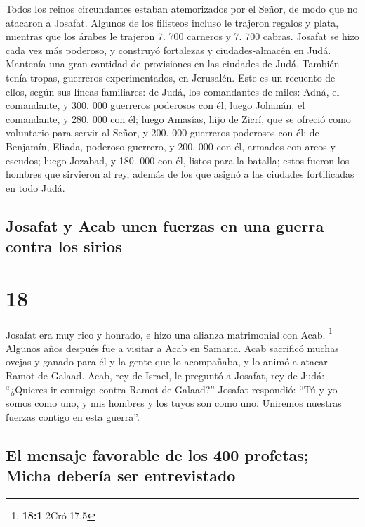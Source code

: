  Todos los reinos circundantes estaban atemorizados por
el Señor, de modo que no atacaron a Josafat.  Algunos de
los filisteos incluso le trajeron regalos y plata, mientras que los
árabes le trajeron 7. 700 carneros y 7. 700 cabras. 
Josafat se hizo cada vez más poderoso, y construyó fortalezas y
ciudades-almacén en Judá.  Mantenía una gran cantidad de
provisiones en las ciudades de Judá. También tenía tropas, guerreros
experimentados, en Jerusalén.  Este es un recuento de
ellos, según sus líneas familiares: de Judá, los comandantes de miles:
Adná, el comandante, y 300. 000 guerreros poderosos con él;
 luego Johanán, el comandante, y 280. 000 con él;
 luego Amasías, hijo de Zicrí, que se ofreció como
voluntario para servir al Señor, y 200. 000 guerreros poderosos con él;
 de Benjamín, Eliada, poderoso guerrero, y 200. 000 con
él, armados con arcos y escudos;  luego Jozabad, y 180.
000 con él, listos para la batalla;  estos fueron los
hombres que sirvieron al rey, además de los que asignó a las ciudades
fortificadas en todo Judá.

\hypertarget{josafat-y-acab-unen-fuerzas-en-una-guerra-contra-los-sirios}{%
\subsection{Josafat y Acab unen fuerzas en una guerra contra los
sirios}\label{josafat-y-acab-unen-fuerzas-en-una-guerra-contra-los-sirios}}

\hypertarget{section-17}{%
\section{18}\label{section-17}}

 Josafat era muy rico y honrado, e hizo una alianza
matrimonial con Acab. \footnote{\textbf{18:1} 2Cró 17,5} 
Algunos años después fue a visitar a Acab en Samaria. Acab sacrificó
muchas ovejas y ganado para él y la gente que lo acompañaba, y lo animó
a atacar Ramot de Galaad.  Acab, rey de Israel, le
preguntó a Josafat, rey de Judá: ``¿Quieres ir conmigo contra Ramot de
Galaad?'' Josafat respondió: ``Tú y yo somos como uno, y mis hombres y
los tuyos son como uno. Uniremos nuestras fuerzas contigo en esta
guerra''.

\hypertarget{el-mensaje-favorable-de-los-400-profetas-micha-deberuxeda-ser-entrevistado}{%
\subsection{El mensaje favorable de los 400 profetas; Micha debería ser
entrevistado}\label{el-mensaje-favorable-de-los-400-profetas-micha-deberuxeda-ser-entrevistado}}

